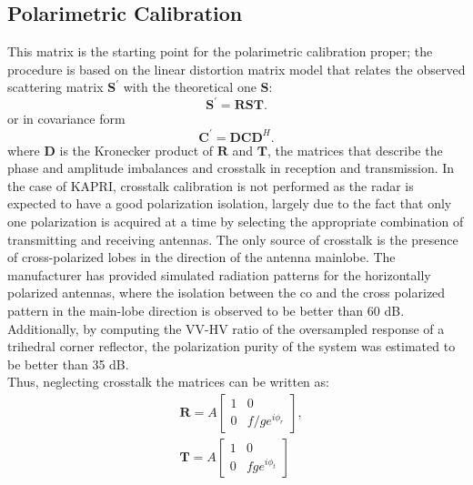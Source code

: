 \subsection{Polarimetric Calibration}\label{sec:methods:proc_polcal}
This matrix is the starting point for the polarimetric calibration proper;
the procedure is based on the linear distortion matrix model\cite{Saraband1990, Sarabandi1992a} that relates the observed scattering matrix $\mathbf{S^\prime}$ with the theoretical one $\mathbf{S}$:
\begin{equation}\label{eq:distorsion_scattering}
	\mathbf{S^\prime} = \mathbf{R} \mathbf{S} \mathbf{T}.
\end{equation}
or in covariance form
\begin{equation}\label{eq:covariance_distortion}
	\mathbf{C}^\prime = \mathbf{D} \mathbf{C} \mathbf{D}^{H}.
\end{equation}
where $\mathbf{D}$ is the Kronecker product of $\mathbf{R}$ and $\mathbf{T}$, the matrices that describe the phase and amplitude imbalances and crosstalk in reception and transmission.
In the case of KAPRI, crosstalk calibration is not performed as the radar is expected to have a good polarization isolation, largely due to the fact that only one polarization is acquired at a time by selecting the appropriate combination of transmitting and receiving antennas. The only source of crosstalk is the presence of cross-polarized lobes in the direction of the antenna mainlobe. The manufacturer has provided simulated radiation patterns for the horizontally polarized antennas, where the isolation between the co and the cross polarized pattern in the main-lobe direction is observed to be better than 60 dB. Additionally, by computing the VV-HV ratio of the oversampled response of a trihedral corner reflector, the polarization purity of the system was estimated to be better than 35 dB.\\
Thus, neglecting crosstalk the matrices can be written as:
\begin{equation}
	\begin{aligned}
	&\mathbf{R} = A \begin{bmatrix}
		1 & 0\\
		0 & f/g e^{i\phi_{r}}
	\end{bmatrix},\\
	&\mathbf{T} = A \begin{bmatrix}
			1 & 0\\
			0 & f g e^{i\phi_{t}}
		\end{bmatrix}
	\end{aligned}
\end{equation}
